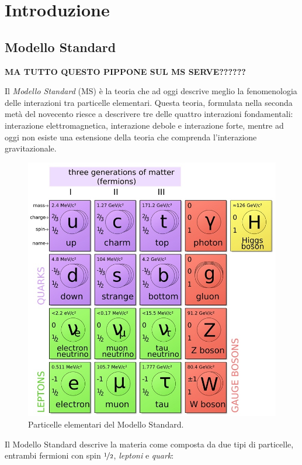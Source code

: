 \chapter{Introduzione}

\section{Modello Standard}

{\bf MA TUTTO QUESTO PIPPONE SUL MS SERVE??????}

Il {\em Modello Standard} (MS) è la teoria che ad oggi descrive meglio la fenomenologia delle interazioni tra particelle elementari. Questa teoria, formulata nella seconda metà del novecento riesce a descrivere tre delle quattro interazioni fondamentali: interazione elettromagnetica, interazione debole e interazione forte, mentre ad oggi non esiste una estensione della teoria che comprenda l'interazione gravitazionale.

\begin{figure}
\centering
\includegraphics[scale=0.3]{Immagini/SM}
\caption{Particelle elementari del Modello Standard.}
\label{fig:SM}
\end{figure}

Il Modello Standard descrive la materia come composta da due tipi di particelle, entrambi fermioni con spin $\nicefrac{1}{2}$, {\em leptoni} e {\em quark}:

